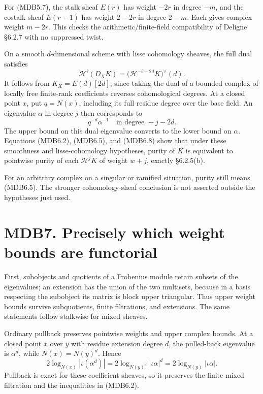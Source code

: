 \documentclass[
]{report}
\begin{document}
For (MDB5.7), the stalk sheaf \(E(r)\) has weight \(-2r\) in degree
\(-m\), and the costalk sheaf \(E(r-1)\) has weight \(2-2r\) in degree
\(2-m\). Each gives complex weight \(m-2r\). This checks the
arithmetic/finite-field compatibility of Deligne §6.2.7 with no
suppressed twist.

On a smooth \(d\)-dimensional scheme with lisse cohomology sheaves, the
full dual satisfies \[
\mathcal H^i(D_XK)
=\bigl(\mathcal H^{-i-2d}K\bigr)^\vee(d).
\tag{MDB6.7}
\] It follows from \(K_X=E(d)[2d]\), since taking the dual of a bounded
complex of locally free finite-rank coefficients reverses cohomological
degrees. At a closed point \(x\), put \(q=N(x)\), including its full
residue degree over the base field. An eigenvalue \(\alpha\) in degree
\(j\) then corresponds to \[
q^{-d}\alpha^{-1}
\quad\text{in degree }-j-2d.
\tag{MDB6.8}
\] The upper bound on this dual eigenvalue converts to the lower bound
on \(\alpha\). Equations (MDB6.2), (MDB6.5), and (MDB6.8) show that
under these smoothness and lisse-cohomology hypotheses, purity of \(K\)
is equivalent to pointwise purity of each \(\mathcal H^jK\) of weight
\(w+j\), exactly §6.2.5(b).

For an arbitrary complex on a singular or ramified situation, purity
still means (MDB6.5). The stronger cohomology-sheaf conclusion is not
asserted outside the hypotheses just used.

\section{MDB7. Precisely which weight bounds are
functorial}\label{mdb7.-precisely-which-weight-bounds-are-functorial}

First, subobjects and quotients of a Frobenius module retain subsets of
the eigenvalues; an extension has the union of the two multisets,
because in a basis respecting the subobject its matrix is block upper
triangular. Thus upper weight bounds survive subquotients, finite
filtrations, and extensions. The same statements follow stalkwise for
mixed sheaves.

Ordinary pullback preserves pointwise weights and upper complex bounds.
At a closed point \(x\) over \(y\) with residue extension degree \(d\),
the pulled-back eigenvalue is \(\alpha^d\), while \(N(x)=N(y)^d\). Hence
\[
2\log_{N(x)}|\iota(\alpha^d)|
=2\log_{N(y)^d}|\iota\alpha|^d
=2\log_{N(y)}|\iota\alpha|.
\tag{MDB7.1}
\] Pullback is exact for these coefficient sheaves, so it preserves the
finite mixed filtration and the inequalities in (MDB6.2).
\end{document}
